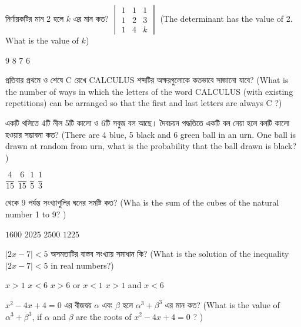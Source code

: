 \documentclass[addpoints]{exam}
\begin{document}
\begin{questions}
\question  নির্ণায়কটির মান 2 হলে $ k $ এর মান কত? $ \begin{vmatrix}
1 & 1 & 1\\
1 & 2 & 3\\
1 & 4 &  k  
\end{vmatrix} $  (The determinant has the value of 2. What is the value of $ k $) 


\begin{oneparchoices}
\choice $ 9 $
\choice $ 8 $
\choice $ 7 $
\choice $ 6 $
\end{oneparchoices}

\question প্রতিবার প্রথমে ও শেষে C রেখে CALCULUS শব্দটির অক্ষরগুলোকে কতভাবে সাজানো যাবে? (What is the number of ways in which the letters of the word  CALCULUS (with existing repetitions) can be arranged so that the first and last letters are always C ?)

\begin{oneparchoices}
\end{oneparchoices}

\question একটি থলিতে 4টি নীল 5টি কালো ও 6টি সবুজ বল আছে। দৈবচয়ন পদ্ধতিতে একটি বল নেয়া হলে বলটি কালো হওয়ার সম্ভাবনা কত? (There are 4 blue, 5 black and 6 green ball in an urn. One ball is drawn at random from urn, what is the probability that the ball drawn is black? )

\begin{oneparchoices}
\choice $ \dfrac{4}{15} $
\choice $ \dfrac{6}{15} $
\choice $ \dfrac{1}{5} $
\choice $ \dfrac{1}{3} $
\end{oneparchoices}

 থেকে 9 পর্যন্ত সংখ্যাগুলির ঘনের সমষ্টি কত? (Wha is the sum of the cubes of the natural number 1 to 9? )


\begin{oneparchoices}
\choice $ 1600 $
\choice $ 2025 $
\choice $ 2500 $
\choice $ 1225 $
\end{oneparchoices}

\question $ |2x-7|<5 $ অসমতাটির বাস্তব সংখ্যায় সমাধান কি? (What is the solution of the inequality $ |2x-7|<5 $ in real numbers?)


\begin{oneparchoices}
\choice $ x>1 $
\choice $ x<6 $
\choice $ x>6 $ or $ x<1 $
\choice $ x>1 $ and $ x<6 $
\end{oneparchoices}

\question $ x^{2}-4x+4=0 $ এর বীজদ্বয় $ \alpha $ এবং $ \beta $ হলে $ \alpha^{3}+ \beta^{3} $ এর মান কত? (What is the value of $ \alpha^{3}+ \beta^{3} $, if $ \alpha $ and $ \beta $ are the roots of $ x^{2}-4x+4=0 $ ? )



\end{questions}
\end{document}
